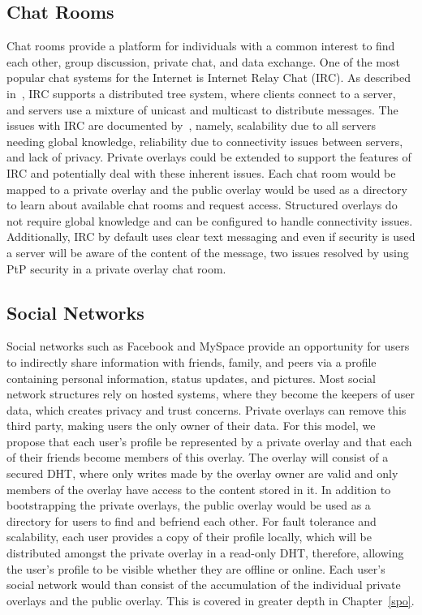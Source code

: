 \subsection{Chat Rooms}
Chat rooms provide a platform for individuals with a common interest to find
each other, group discussion, private chat, and data exchange.  One of the most
popular chat systems for the Internet is Internet Relay Chat (IRC).  As
described in~\cite{irc}, IRC supports a distributed tree system, where clients
connect to a server, and servers use a mixture of unicast and multicast to
distribute messages.  The issues with IRC are documented by~\cite{irc_arch},
namely, scalability due to all servers needing global knowledge, reliability due
to connectivity issues between servers, and lack of privacy.  Private overlays
could be extended to support the features of IRC and potentially deal with these
inherent issues.  Each chat room would be mapped to a private overlay and the
public overlay would be used as a directory to learn about available chat rooms
and request access.  Structured overlays do not require global knowledge and can
be configured to handle connectivity issues.  Additionally, IRC by default uses
clear text messaging and even if security is used a server will be aware of the
content of the message, two issues resolved by using PtP security in a private
overlay chat room.  

\subsection{Social Networks}
Social networks such as Facebook and MySpace provide an opportunity for users to
indirectly share information with friends, family, and peers via a profile
containing personal information, status updates, and pictures.
Most social network structures rely on hosted systems, where they become
the keepers of user data, which creates privacy and trust concerns.  Private overlays
can remove this third party, making users the only owner of their data.  For this
model, we propose that each user's profile be represented by a private overlay
and that each of their friends become members of this overlay.  The overlay will
consist of a secured DHT, where only writes made by the overlay owner are valid
and only members of the overlay have access to the content stored in it.  In
addition to bootstrapping the private overlays, the public overlay would be
used as a directory for users to find and befriend each other.  For fault
tolerance and scalability, each user provides a copy of their profile
locally, which will be distributed amongst the private overlay in a read-only
DHT, therefore, allowing the user's profile to be visible whether they are
offline or online.  Each user's social network would than consist of the
accumulation of the individual private overlays and the public overlay.
This is covered in greater depth in Chapter~\ref{spo}.

